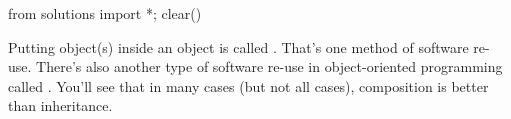 \begin{python0}
from solutions import *; clear()
\end{python0}

Putting object(s) inside an object is called .
That's one method of software re-use. There's also another type of software re-use in object-oriented programming called . You'll see that in many cases (but not all cases), composition is better than inheritance.



